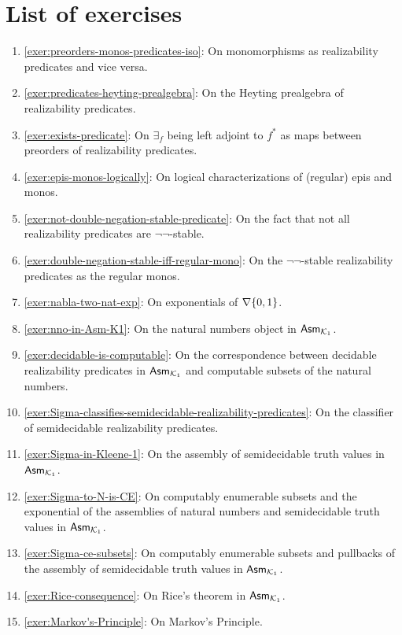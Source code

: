 \section{List of exercises}
\begin{enumerate}
\item \cref{exer:preorders-monos-predicates-iso}: On monomorphisms as
  realizability predicates and vice versa.
\item \cref{exer:predicates-heyting-prealgebra}: On the Heyting prealgebra of
  realizability predicates.
\item \cref{exer:exists-predicate}: On \(\exists_f\) being left adjoint to
  \(f^\ast\) as maps between preorders of realizability predicates.
\item \cref{exer:epis-monos-logically}: On logical characterizations of
  (regular) epis and monos.
\item \cref{exer:not-double-negation-stable-predicate}: On the fact that not all
  realizability predicates are \(\lnot\lnot\)-stable.
\item \cref{exer:double-negation-stable-iff-regular-mono}: On the
  \(\lnot\lnot\)-stable realizability predicates as the regular monos.
\item \cref{exer:nabla-two-nat-exp}: On exponentials of \(\nabla\{0,1\}\).
\item \cref{exer:nno-in-Asm-K1}: On the natural numbers object in
  \(\mathsf{Asm}_{\mathcal{K}_1}\).
\item \cref{exer:decidable-is-computable}: On the correspondence between
  decidable realizability predicates in \(\mathsf{Asm}_{\mathcal{K}_1}\) and computable subsets
  of the natural numbers.
\item \cref{exer:Sigma-classifies-semidecidable-realizability-predicates}: On
  the classifier of semidecidable realizability predicates.
\item \cref{exer:Sigma-in-Kleene-1}: On the assembly of semidecidable truth
  values in \(\mathsf{Asm}_{\mathcal{K}_1}\).
\item \cref{exer:Sigma-to-N-is-CE}: On computably enumerable subsets and the
  exponential of the assemblies of natural numbers and semidecidable truth
  values in \(\mathsf{Asm}_{\mathcal{K}_1}\).
\item \cref{exer:Sigma-ce-subsets}: On computably enumerable subsets and
  pullbacks of the assembly of semidecidable truth values in \(\mathsf{Asm}_{\mathcal{K}_1}\).
\item \cref{exer:Rice-consequence}: On Rice's theorem in \(\mathsf{Asm}_{\mathcal{K}_1}\).
\item \cref{exer:Markov's-Principle}: On Markov's Principle.
\end{enumerate}

